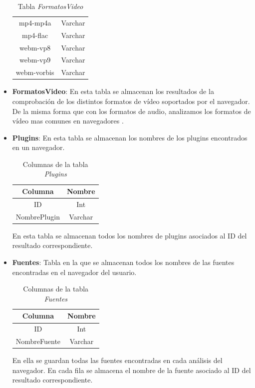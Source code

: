 \begin{itemize}
\begin{table}[tbp]
\begin{minipage}[c]{70mm}
\begin{tabular}{c|c}
                mp4-mp4a & Varchar\\
                mp4-flac & Varchar\\
                webm-vp8 & Varchar\\
                webm-vp9 & Varchar\\
                webm-vorbis & Varchar\\
            \end{tabular}
            \caption{Tabla \textit{FormatosVideo}}
            \label{tab:formatosVideo}
        \end{minipage}
    \end{table}
    \item \textbf{FormatosVideo}: En esta tabla se almacenan los resultados de la comprobación de los distintos formatos de vídeo soportados por el navegador. De la misma forma que con los formatos de audio, analizamos los formatos de vídeo mas comunes en navegadores \cite{Formatos}.\par
    \item \textbf{Plugins}: En esta tabla se almacenan los nombres de los plugins encontrados en un navegador.
    \begin{table}[H]
        \centering
        \begin{tabular}{c|c}
             \textbf{Columna} & \textbf{Nombre} \\ \hline
             ID & Int \\
             NombrePlugin & Varchar\\
        \end{tabular}
        \caption{Columnas de la tabla \textit{Plugins}}
        \label{tab:plugins}
    \end{table}
    En esta tabla se almacenan todos los nombres de plugins asociados al ID del resultado correspondiente.
    \item \textbf{Fuentes}: Tabla en la que se almacenan todos los nombres de las fuentes encontradas en el navegador del usuario.
    \begin{table}[tbp]
        \centering
        \begin{tabular}{c|c}
             \textbf{Columna} & \textbf{Nombre} \\ \hline
             ID & Int \\
             NombreFuente & Varchar\\
        \end{tabular}
        \caption{Columnas de la tabla \textit{Fuentes}}
        \label{tab:plugins}
    \end{table}
    En ella se guardan todas las fuentes encontradas en cada análisis del navegador. En cada fila se almacena el nombre de la fuente asociado al ID del resultado correspondiente.
\end{itemize}
